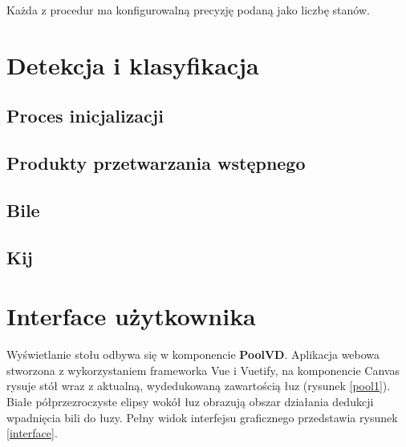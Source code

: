 \documentclass[12pt]{article}
\begin{document}
Każda z procedur ma konfigurowalną precyzję podaną jako liczbę stanów.

\section{Detekcja i klasyfikacja}


\subsection{Proces inicjalizacji}

\subsection{Produkty przetwarzania wstępnego}

\subsection{Bile}
\subsection{Kij}


\section{Interface użytkownika}

Wyświetlanie stołu odbywa się w komponencie \textbf{PoolVD}. Aplikacja webowa stworzona z wykorzystaniem frameworka Vue i Vuetify, na komponencie Canvas rysuje stół wraz z aktualną, wydedukowaną zawartością łuz (rysunek \ref{pool1}). Białe półprzezroczyste elipsy wokół łuz obrazują obszar działania dedukcji wpadnięcia bili do łuzy. Pełny widok interfejsu graficznego przedstawia rysunek \ref{interface}.
\end{document}

